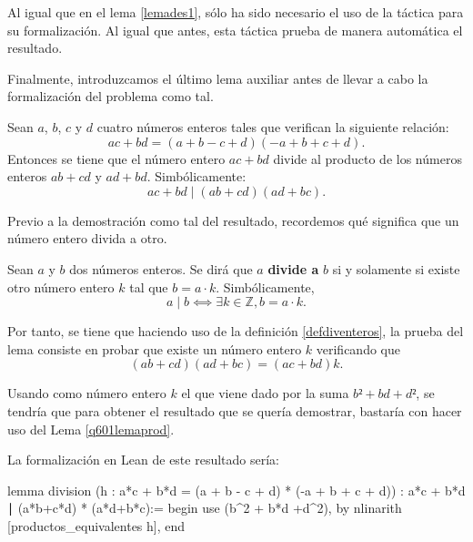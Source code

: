Al igual que en el lema \ref{lemades1}, sólo ha sido necesario el uso de
la táctica  para su formalización. Al
igual que antes, esta táctica prueba de manera automática el resultado.

Finalmente, introduzcamos el último lema auxiliar antes de llevar a cabo
la formalización del problema como tal.

\begin{lema}[division]\label{lemadivisionq6}
  Sean \(a\), \(b\), \(c\) y \(d\) cuatro números enteros tales que
  verifican la siguiente relación:
    \begin{equation}\tag{h}
      ac+bd = (a+b-c+d)(-a+b+c+d).
    \end{equation}
    Entonces se tiene que el número entero \(ac+bd\) divide al producto
    de los números enteros \(ab+cd\) y \(ad+bd\). Simbólicamente:
    \begin{equation}
      ac+bd ∣ (ab+cd)(ad+bc).
    \end{equation}
\end{lema}

\begin{demostracion}
  Previo a la demostración como tal del resultado, recordemos qué
  significa que un número entero divida a otro.
  \begin{definicion}\label{defdiventeros}
    Sean \(a\) y \(b\) dos números enteros. Se dirá que \(a\)
    \textbf{divide a} \(b\) si y solamente si existe otro número entero
    \(k\) tal que \(b = a · k\).  Simbólicamente,
    \begin{equation}
    a \mid b ⟺ ∃ k ∈ ℤ, b = a · k.
    \end{equation}
  \end{definicion}

  Por tanto, se tiene que haciendo uso de la definición
  \ref{defdiventeros}, la prueba del lema consiste en probar que existe
  un número entero \(k\) verificando que
  \begin{equation}
    (ab+cd)(ad+bc)=(ac+bd)k.
  \end{equation}

  Usando como número entero \(k\) el que viene dado por la suma
  \(b²+bd+d²\), se tendría que para obtener el resultado que se quería
  demostrar, bastaría con hacer uso del Lema \ref{q601lemaprod}.
\end{demostracion}

La formalización en Lean de este resultado sería:
\begin{leancode}
lemma division
  (h : a*c + b*d = (a + b - c + d) * (-a + b + c + d))
  : a*c + b*d ∣ (a*b+c*d) * (a*d+b*c):=
begin
  use (b^2 + b*d +d^2),
  by nlinarith [productos_equivalentes h],
end
\end{leancode}

